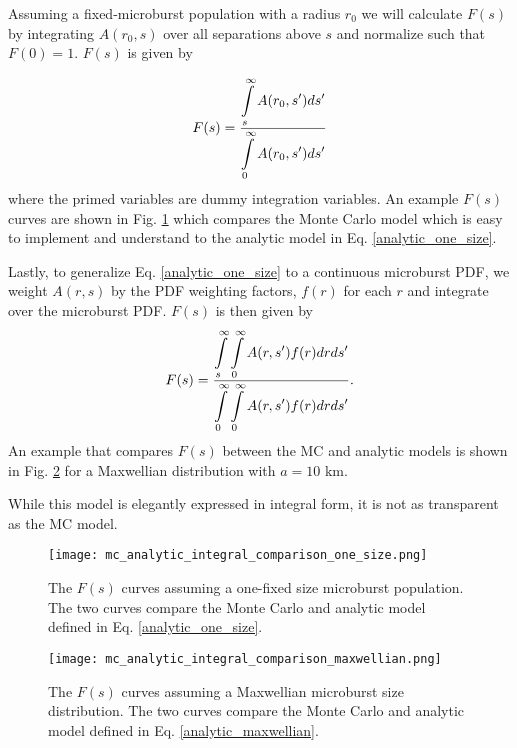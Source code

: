 \documentclass[12pt]{article}
\begin{document}
Assuming a fixed-microburst population with a radius $r_0$ we will calculate $F(s)$ by integrating $A(r_0, s)$ over all separations above $s$ and normalize such that $F(0) = 1$. $F(s)$ is given by

\begin{equation} \label{analytic_one_size}
F(s) = \frac{\displaystyle\int\displaylimits_{s}^{\infty} A(r_0, s') ds'}{\displaystyle\int\displaylimits_{0}^{\infty	} A(r_0, s') ds'}
\end{equation} where the primed variables are dummy integration variables. An example $F(s)$ curves are shown in Fig. \ref{fig_one_size} which compares the Monte Carlo model which is easy to implement and understand to the analytic model in Eq. \ref{analytic_one_size}.

Lastly, to generalize Eq. \ref{analytic_one_size} to a continuous microburst PDF, we weight $A(r, s)$ by the PDF weighting factors, $f(r)$ for each $r$ and integrate over the microburst PDF. $F(s)$ is then given by
\begin{equation} \label{analytic_maxwellian}
F(s) = \frac{\displaystyle\int\displaylimits_{s}^{\infty} \displaystyle\int\displaylimits_0^{\infty} A(r, s') f(r) dr ds'}{\displaystyle\int\displaylimits_{0}^{\infty} \displaystyle\int\displaylimits_0^{\infty} A(r, s') f(r) dr ds'} .
\end{equation} An example that compares $F(s)$ between the MC and analytic models is shown in Fig. \ref{fig_maxwellian} for a Maxwellian distribution with $a = 10$ km.

While this model is elegantly expressed in integral form, it is not as transparent as the MC model.

\begin{figure}
\texttt{[image: mc\_analytic\_integral\_comparison\_one\_size.png]}
\caption{The $F(s)$ curves assuming a one-fixed size microburst population. The two curves compare the Monte Carlo and analytic model defined in Eq. \ref{analytic_one_size}.} \label{fig_one_size}
\end{figure}

\begin{figure}
\texttt{[image: mc\_analytic\_integral\_comparison\_maxwellian.png]}
\caption{The $F(s)$ curves assuming a Maxwellian microburst size distribution. The two curves compare the Monte Carlo and analytic model defined in Eq. \ref{analytic_maxwellian}.} \label{fig_maxwellian}
\end{figure}
\end{document}
